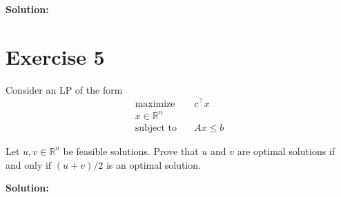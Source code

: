 \documentclass{article}
\begin{document}
\textbf{Solution: }
\newpage

\section*{Exercise 5}
Consider an LP of the form
\begin{align*}
\text{maximize} \quad & c^\top x \\
x \in \mathbb{R}^n \\
\text{subject to} \quad & Ax \leq b
\end{align*}

Let $u, v \in \mathbb{R}^n$ be feasible solutions. Prove that $u$ and $v$ are optimal solutions if and only if $(u + v)/2$ is an optimal solution.

\textbf{Solution: }
\end{document}
